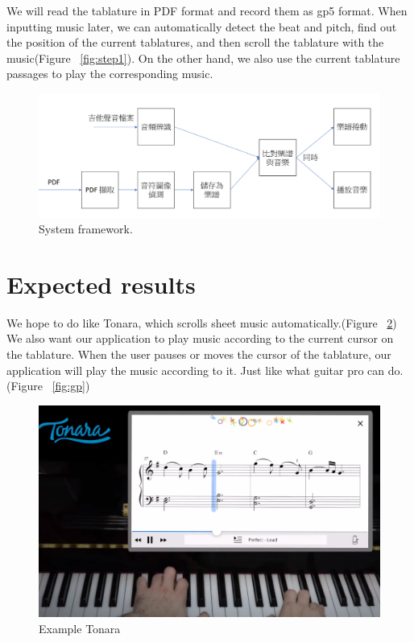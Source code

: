\documentclass[10pt,twocolumn,letterpaper]{article}
\begin{document}
\begin{CJK}{UTF8}{bsmi}
We will read the tablature in PDF format and record them as gp5 format. When inputting music later, we can automatically detect the beat and pitch, find out the position of the current tablatures, and then scroll the tablature with the music(Figure ~\ref{fig:step1}). On the other hand, we also use the current tablature passages to play the corresponding music.

\begin{figure}
\begin{center}
\includegraphics[width=.9\linewidth]{step1.png}
\end{center}
   \caption{System framework.}
\label{fig:step}
\end{figure}

\section{Expected results}

We hope to do like Tonara\cite{Tonara}, which scrolls sheet music automatically.(Figure ~\ref{fig:tonara}) We also want our application to play music according to the current cursor on the tablature. When the user pauses or moves the cursor of the tablature, our application will play the music according to it. Just like what guitar pro can do.(Figure ~\ref{fig:gp})

\begin{figure}[t]
\begin{center}
   \includegraphics[width=0.8\linewidth]{tonara.png}
\end{center}
   \caption{Example Tonara\cite{Tonara2}}
\label{fig:long}
\label{fig:tonara}
\end{figure}

{\small


}

\end{CJK}
\end{document}
